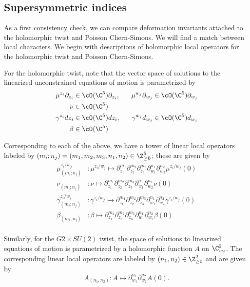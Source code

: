 \subsection{Supersymmetric indices}

As a first consistency check, we can compare deformation invariants attached to the holomorphic twist and Poisson Chern-Simons. 
We will find a match between local characters. We begin with descriptions of holomorphic local operators for the holomorphic twist and Poisson Chern-Simons.

For the holomorphic twist, note that the vector space of solutions to the linearized unconstrained equations of motion is parametrized by 
\begin{align*}
\mu^{z_i}\partial_{z_i} & \in \cO(\C^5)\partial_{z_i},\ \ \ \ \ \mu^{w_j}\partial_{w_j}\in\cO (\C^5)\partial_{w_j}  \\
\nu & \in \cO (\C^5) \\
\gamma^{z_i}dz_i & \in \cO (\C^5)dz_i, \ \ \ \ \ \gamma^{w_j}d_{w_j}\in\cO (\C^5)d_{w_j} \\
\beta & \in \cO (\C^5)
\end{align*}

Corresponding to each of the above, we have a tower of linear local operators labeled by $(m_i; n_j) = (m_1, m_2, m_3, n_1,  n_2)\in \Z^5_{\geq 0}$; these are given by
\begin{align*}
 \mu^{z_i/w_j}_{(m_i; n_j)} &: \mu^{z_i/w_j}\mapsto \partial_{z_1}^{m_1}\partial_{z_2}^{m_2}\partial_{z_3}^{m_3}\partial_{w_1}^{n_1}\partial_{w_2}^{n_2}\mu^{z_i/w_j} (0) \\
\nu_{(m_i; n_j)} &: \nu\mapsto \partial_{z_1}^{m_1}\partial_{z_2}^{m_2}\partial_{z_3}^{m_3}\partial_{w_1}^{n_1}\partial_{w_2}^{n_2}\nu (0) \\
\gamma^{z_i/w_j}_{(m_i; n_j)} &: \gamma^{z_i/w_j}\mapsto \partial_{z_1}^{m_1}\partial_{z_2}^{m_2}\partial_{z_3}^{m_3}\partial_{w_1}^{n_1}\partial_{w_2}^{n_2}\gamma^{z_i/w_j} (0) \\
 \beta_{(m_i; n_j)} &: \beta\mapsto \partial_{z_1}^{m_1}\partial_{z_2}^{m_2}\partial_{z_3}^{m_3}\partial_{w_1}^{n_1}\partial_{w_2}^{n_2}\beta (0) \\
\end{align*}

Similarly, for the $G2\times SU(2)$ twist, the space of solutions to linearized equations of motion is parametrized by a holomorphic function $A$ on $\C^2_{w_j}$. The corresponding linear local operators are labeled by $(n_1,n_2)\in \Z^2_{\geq 0}$  and are given by \[A_{(n_1,n_2)} : A \mapsto \partial_{w_1}^{n_1}\partial_{w_2}^{n_2} A (0).\]

